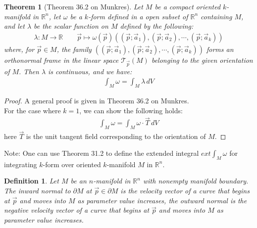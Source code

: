 \documentclass[15pt]{book}
\theoremstyle{break}
\theoremstyle{break}
\newtheorem{thm}{Theorem}[section]
\newtheorem{defn}{Definition}[corL]
\newcommand{\R}{\mathbb{R}}
\newcommand{\T}{\mathcal{T}}
\newcommand{\note}{\color{red}Note: \color{black}}
\begin{document}
\begin{thm}[Theorem 36.2 on Munkres]
Let $M$ be a compact oriented $k$-manifold in $\R^n$, let $\omega$ be a $k$-form defined in a open subset of $\R^n$ containing $M$, and let $\lambda$ be the scalar function on $M$ defined by the following:
\begin{align*}
\lambda:M \to \R \qquad \vec{p}\mapsto \omega(\vec{p})((\vec{p};\vec{a}_1),(\vec{p};\vec{a}_2),\cdots, (\vec{p};\vec{a}_k))
\end{align*}
where, for $\vec{p}\in M$, the family $((\vec{p};\vec{a}_1),(\vec{p};\vec{a}_2),\cdots, (\vec{p};\vec{a}_k))$ forms an orthonormal frame in the linear space $\T_{\vec{p}}(M)$ belonging to the given orientation of $M$. Then $\lambda$ is continuous, and we have:
\begin{align*}
\int_M \omega = \int_M \lambda \, dV
\end{align*}
\end{thm}
\begin{proof}
A general proof is given in Theorem 36.2 on Munkres. \\
For the case where $k=1$, we can show the following holds:
\begin{align*}
\int_M \omega = \int_M \omega\cdot \vec{T} \, dV
\end{align*}
here $\vec{T}$ is the unit tangent field corresponding to the orientation of $M$.
\end{proof}

\note One can use Theorem 31.2 to define the extended integral $ext\int_M \omega$ for integrating $k$-form over oriented $k$-manifold $M$ in $\R^n$.


\begin{defn}
Let $M$ be an $n$-manifold in $\R^n$ with nonempty manifold boundary. The inward normal to $\partial M$ at $\vec{p}\in \partial M$ is the velocity vector of a curve that begins at $\vec{p}$ and moves into $M$ as parameter value increases, the outward normal is the negative velocity vector of a curve that begins at $\vec{p}$ and moves into $M$ as parameter value increases.
\end{defn}
\end{document}
